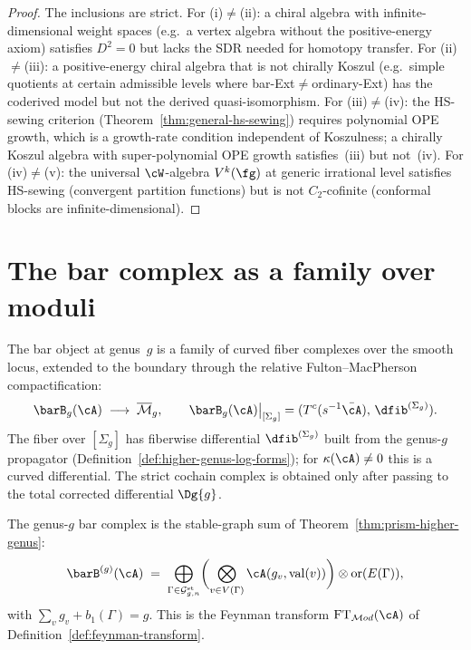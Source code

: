 \begin{proof}
The inclusions are strict. For (i)$\neq$(ii): a chiral
algebra with infinite-dimensional weight spaces (e.g.\ a
vertex algebra without the positive-energy axiom) satisfies
$D^2=0$ but lacks the SDR needed for homotopy transfer.
For (ii)$\neq$(iii): a positive-energy chiral algebra that is
not chirally Koszul (e.g.\ simple quotients at certain
admissible levels where bar-Ext$\neq$ordinary-Ext) has the
coderived model but not the derived quasi-isomorphism.
For (iii)$\neq$(iv): the HS-sewing criterion
(Theorem~\ref{thm:general-hs-sewing}) requires polynomial
OPE growth, which is a growth-rate condition independent of
Koszulness; a chirally Koszul algebra with super-polynomial
OPE growth satisfies~(iii) but not~(iv).
For (iv)$\neq$(v): the universal $\cW$-algebra $V^k(\fg)$
at generic irrational level satisfies HS-sewing (convergent
partition functions) but is not $C_2$-cofinite (conformal
blocks are infinite-dimensional).
\end{proof}

\section{The bar complex as a family over moduli}
\label{sec:geometric-prologue}
\label{subsec:bar-family-moduli}

The bar object at genus~$g$ is a family of curved fiber complexes over
the smooth locus, extended to the boundary through the relative
Fulton--MacPherson compactification:
\begin{equation}\label{eq:bar-family}
\barB_g(\cA) \;\longrightarrow\; \overline{\mathcal{M}}_g,
\qquad
\barB_g(\cA)\big|_{[\Sigma_g]}
= (T^c(s^{-1}\bar{\cA}),\, \dfib^{(\Sigma_g)}).
\end{equation}
The fiber over $[\Sigma_g]$ has fiberwise differential
$\dfib^{(\Sigma_g)}$ built from the genus-$g$ propagator
(Definition~\ref{def:higher-genus-log-forms}); for
$\kappa(\cA)\neq0$ this is a curved differential. The strict
cochain complex is obtained only after passing to the total corrected
differential $\Dg{g}$.

\begin{remark}
\label{rem:bar-stable-graph-sum}
The genus-$g$ bar complex is the stable-graph sum of
Theorem~\ref{thm:prism-higher-genus}:
\begin{equation}\label{eq:bar-graph-sum}
\barB^{(g)}(\cA)
\;=\;
\bigoplus_{\Gamma \in \mathcal{G}^{\mathrm{st}}_{g,n}}
\biggl(\bigotimes_{v \in V(\Gamma)}
\cA(g_v, \operatorname{val}(v))\biggr)
\otimes \operatorname{or}(E(\Gamma)),
\end{equation}
with $\sum_v g_v + b_1(\Gamma) = g$. This is the Feynman transform
$\mathrm{FT}_{\mathcal{M}od}(\cA)$ of
Definition~\ref{def:feynman-transform}.
\end{remark}

